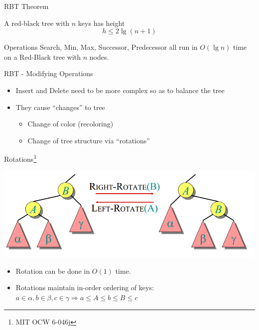 \documentclass{beamer}
\begin{document}
\begin{frame}{RBT Theorem}
    \begin{theorem}
        A red-black tree with $n$ keys has height 
            $$h \leq 2 \lg (n+1)$$
    \end{theorem}
    \begin{corollary}
        Operations Search, Min, Max, Successor, Predecessor all run in $O(\lg n)$ time  
        on a Red-Black tree with $n$ nodes.
    \end{corollary}
\end{frame}


\begin{frame}{RBT - Modifying Operations}
    \begin{itemize}
        \item Insert and Delete need to be more complex so as to balance the tree
        \item They cause ``changes'' to tree
        \begin{itemize}
            \item Change of color (recoloring)
            \item Change of tree structure via ``rotations''
        \end{itemize}
    \end{itemize}
\end{frame}


\begin{frame}{Rotations\footnote{MIT OCW 6-046j}}
    \begin{center}
        \includegraphics[scale=0.4]{rotationsEg.png}
    \end{center}
    \begin{itemize}
        \item Rotation can be done in $O(1)$ time. 
        \item Rotations maintain in-order ordering of keys: 
            $a \in \alpha, b \in \beta, c \in \gamma \Rightarrow a \leq A \leq b \leq B \leq c$
    \end{itemize}
\end{frame}
\end{document}

